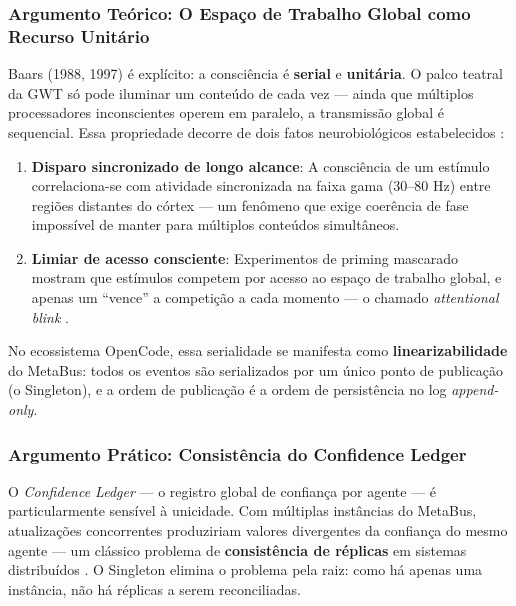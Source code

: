 \subsubsection*{Argumento Teórico: O Espaço de Trabalho Global como Recurso Unitário}

Baars (1988, 1997) é explícito: a consciência é \textbf{serial} e \textbf{unitária}. O palco teatral da GWT só pode iluminar um conteúdo de cada vez — ainda que múltiplos processadores inconscientes operem em paralelo, a transmissão global é sequencial. Essa propriedade decorre de dois fatos neurobiológicos estabelecidos \cite{Baars1988_GWT, Dehaene2011_Consciousness}:

\begin{enumerate}
    \item \textbf{Disparo sincronizado de longo alcance}: A consciência de um estímulo correlaciona-se com atividade sincronizada na faixa gama (30--80 Hz) entre regiões distantes do córtex — um fenômeno que exige coerência de fase impossível de manter para múltiplos conteúdos simultâneos.
    
    \item \textbf{Limiar de acesso consciente}: Experimentos de priming mascarado mostram que estímulos competem por acesso ao espaço de trabalho global, e apenas um ``vence'' a competição a cada momento — o chamado \textit{attentional blink} \cite{Raymond1992_AttentionalBlink}.
\end{enumerate}

No ecossistema OpenCode, essa serialidade se manifesta como \textbf{linearizabilidade} do MetaBus: todos os eventos são serializados por um único ponto de publicação (o Singleton), e a ordem de publicação é a ordem de persistência no log \textit{append-only}.

\subsubsection*{Argumento Prático: Consistência do Confidence Ledger}

O \textit{Confidence Ledger} — o registro global de confiança por agente — é particularmente sensível à unicidade. Com múltiplas instâncias do MetaBus, atualizações concorrentes produziriam valores divergentes da confiança do mesmo agente — um clássico problema de \textbf{consistência de réplicas} em sistemas distribuídos \cite{Brewer2000_CAP}. O Singleton elimina o problema pela raiz: como há apenas uma instância, não há réplicas a serem reconciliadas.


